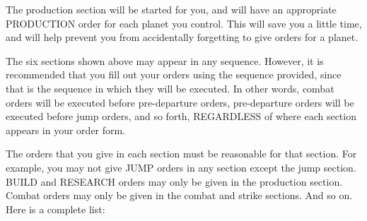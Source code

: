 \documentclass[10pt,titlepage]{article}
\begin{document}
The production section will be started for you, and will have an appropriate
PRODUCTION order for each planet you control.  This will save you a little
time, and will help prevent you from accidentally forgetting to give orders
for a planet.

The six sections shown above may appear in any sequence.  However, it is
recommended that you fill out your orders using the sequence provided,
since that is the sequence in which they will be executed.  In other words,
combat orders will be executed before pre-departure orders, pre-departure
orders will be executed before jump orders, and so forth, REGARDLESS of where
each section appears in your order form.

The orders that you give in each section must be reasonable for that section.
For example, you may not give JUMP orders in any section except the jump
section.  BUILD and RESEARCH orders may only be given in the production
section.  Combat orders may only be given in the combat and strike sections.
And so on.  Here is a complete list:
\end{document}
